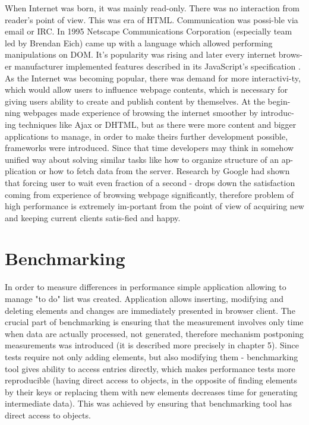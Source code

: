 \documentclass[inzynier,druk,ramka]{build/dyplom}
\begin{document}
When Internet was born, it was mainly read-only. There was no interaction from reader’s point of view. This was era of HTML. Communication was possi-ble via email or IRC. In 1995 Netscape Communications Corporation (especially team led by Brendan Eich) came up with a language which allowed performing manipulations on DOM. It’s popularity was rising and later every internet brows-er manufacturer implemented features described in its JavaScript’s specification  . As the Internet was becoming popular, there was demand for more interactivi-ty, which would allow users to influence webpage contents, which is necessary for giving users ability to create and publish content by themselves. At the begin-ning webpages made experience of browsing the internet smoother by introduc-ing techniques like Ajax or DHTML, but as there were more content and bigger applications to manage, in order to make theirs further development possible, frameworks were introduced. Since that time developers may think in somehow unified way about solving similar tasks like how to organize structure of an ap-plication or how to fetch data from the server.
Research by Google  had shown that forcing user to wait even fraction of a second - drops down the satisfaction coming from experience of browsing webpage significantly, therefore problem of high performance is extremely im-portant from the point of view of acquiring new and keeping current clients satis-fied and happy.

\section{Benchmarking}
In order to measure differences in performance simple application allowing to manage "to do" list was created. Application allows inserting, modifying and deleting elements and changes are immediately presented in browser client.
The crucial part of benchmarking is ensuring that the measurement involves only time when data are actually processed, not generated, therefore mechanism postponing measurements was introduced (it is described more precisely in chapter 5). Since tests require not only adding elements, but also modifying them - benchmarking tool gives ability to access entries directly, which makes performance tests more reproducible (having direct access to objects, in the opposite of finding elements by their keys or replacing them with new elements decreases time for generating intermediate data). This was achieved by ensuring that benchmarking tool has direct access to objects.
\end{document}
